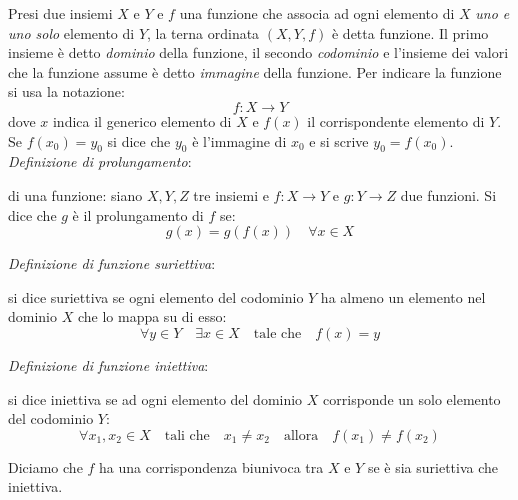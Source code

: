     Presi due insiemi $X$ e $Y$ e $f$ una funzione che associa ad ogni elemento 
    di $X$ \emph{uno e uno solo} elemento di $Y$, la terna ordinata $(X,Y,f)$ è detta funzione.
    Il primo insieme è detto \emph{dominio} della funzione, il secondo \emph{codominio} e 
    l'insieme dei valori che la funzione assume è detto \emph{immagine} della funzione. Per indicare la funzione si usa la notazione:
        \begin{equation}
            f: X \to Y
        \end{equation}
        dove $x$ indica il generico elemento di $X$ e $f(x)$ il corrispondente elemento di $Y$.
        Se $f(x_0)=y_0$ si dice che $y_0$ è l'immagine di $x_0$ e si scrive $y_0=f(x_0)$. 
         \emph{Definizione di prolungamento}: 
        \begin{definizione} di una funzione: siano $X,Y,Z$ tre insiemi e $f: X \to Y$ e $g: Y \to Z$ due funzioni. Si dice che $g$ è il prolungamento di $f$ se:
        \begin{equation}
            g(x)=g(f(x)) \quad \forall x \in X
        \end{equation}
    \end{definizione}
    \vspace{0.1cm} %
    \emph{Definizione di funzione suriettiva}: 
    \begin{definizione} 
        si dice suriettiva se ogni elemento del codominio $Y$ ha almeno un elemento nel dominio $X$ che lo mappa su di esso:
        \begin{equation}
            \forall y \in Y \quad \exists x \in X \quad \text{tale che} \quad f(x)=y
        \end{equation}  
    \end{definizione}
    \emph{Definizione di funzione iniettiva}: 
    \begin{definizione} si dice iniettiva se ad ogni elemento del dominio $X$ corrisponde un solo elemento del codominio $Y$:
        \begin{equation}
            \forall x_1,x_2 \in X \quad \text{tali che} \quad x_1 \neq x_2 \quad \text{allora} \quad f(x_1) \neq f(x_2)
        \end{equation}
    \end{definizione}
\begin{definizione}
    Diciamo che $f$ ha una corrispondenza biunivoca tra $X$ e $Y$ se è sia suriettiva che iniettiva.
\end{definizione}

